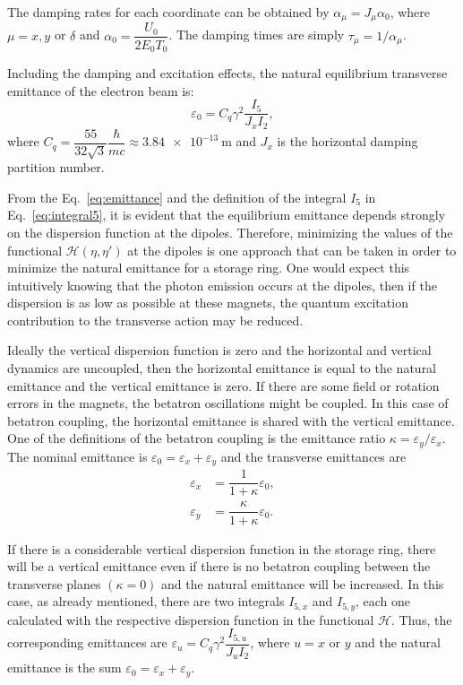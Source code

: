 The damping rates for each coordinate can be obtained by $\alpha_{\mu} = J_{\mu} \alpha_0$, where $\mu = x, y$ or $\delta$ and $\alpha_0 = \dfrac{U_0}{2E_0T_0}$. The damping times are simply $\tau_{\mu} = 1/\alpha_{\mu}$.

Including the damping and excitation effects, the natural equilibrium transverse emittance of the electron beam is:
\begin{equation}
    \varepsilon_0 = C_q \gamma^2 \dfrac{I_5}{J_x I_2},
    \label{eq:emittance}
\end{equation}
where $C_q = \dfrac{55}{32 \sqrt{3}}\dfrac{\hbar}{mc} \approx \SI{3.84e-13}{\metre}$ and $J_x$ is the horizontal damping partition number.

From the Eq.~\eqref{eq:emittance} and the definition of the integral $I_5$ in Eq.~\eqref{eq:integral5}, it is evident that the equilibrium emittance depends strongly on the dispersion function at the dipoles. Therefore, minimizing the values of the functional $\mathcal{H}(\eta, \eta')$ at the dipoles is one approach that can be taken in order to minimize the natural emittance for a storage ring. One would expect this intuitively knowing that the photon emission occurs at the dipoles, then if the dispersion is as low as possible at these magnets, the quantum excitation contribution to the transverse action may be reduced.

Ideally the vertical dispersion function is zero and the horizontal and vertical dynamics are uncoupled, then the horizontal emittance is equal to the natural emittance and the vertical emittance is zero. If there are some field or rotation errors in the magnets, the betatron oscillations might be coupled. In this case of betatron coupling, the horizontal emittance is shared with the vertical emittance. One of the definitions of the betatron coupling is the emittance ratio $\kappa = \varepsilon_y/\varepsilon_x$. The nominal emittance is $\varepsilon_0 = \varepsilon_x + \varepsilon_y$ and the transverse emittances are
\begin{align}
    \varepsilon_x &= \dfrac{1}{1 + \kappa}\varepsilon_0, \\
    \varepsilon_y &= \dfrac{\kappa}{1 + \kappa}\varepsilon_0.
\end{align}

If there is a considerable vertical dispersion function in the storage ring, there will be a vertical emittance even if there is no betatron coupling between the transverse planes $(\kappa = 0)$ and the natural emittance will be increased. In this case, as already mentioned, there are two integrals $I_{5, x}$ and $I_{5, y}$, each one calculated with the respective dispersion function in the functional $\mathcal{H}$. Thus, the corresponding emittances are $\varepsilon_u = C_q \gamma^2 \dfrac{I_{5, u}}{J_u I_2}$, where $u=x$ or $y$ and the natural emittance is the sum $\varepsilon_0 = \varepsilon_x + \varepsilon_y$.
